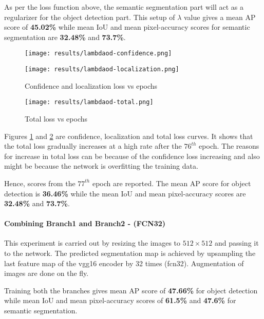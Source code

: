 \begin{itemize}
As per the loss function above, the semantic segmentation part will act as a regularizer for the object detection part. This setup of $\lambda$ value gives a mean AP score of \textbf{45.02\%} while mean IoU and mean pixel-accuracy scores for semantic segmentation are \textbf{32.48\%} and \textbf{73.7\%}.

\begin{figure}[h!]
\begin{multicols}{2}
    \texttt{[image: results/lambdaod-confidence.png]}\par \texttt{[image: results/lambdaod-localization.png]}\par
    \end{multicols}
\caption{Confidence and localization loss vs epochs}
\label{conf_loc}
\end{figure}

\begin{figure}[h!]
\centering
    \texttt{[image: results/lambdaod-total.png]}
    \caption{Total loss vs epochs}
    \label{totallosslambda}
\end{figure}

\end{itemize}

Figures \ref{conf_loc} and \ref{totallosslambda} are confidence, localization and total loss curves. It shows that the total loss gradually increases at a high rate after the $76^{th}$ epoch. The reasons for increase in total loss can be because of the confidence loss increasing and also might be because the network is overfitting the training data. 

Hence, scores from the $77^{th}$ epoch are reported. The mean AP score for object detection is \textbf{36.46\%} while the mean IoU and mean pixel-accuracy scores are \textbf{32.48\%} and \textbf{73.7\%}.

\paragraph{Combining Branch1 and Branch2 - (FCN32)}

This experiment is carried out by resizing the images to $512\times512$ and passing it to the network. The predicted segmentation map is achieved by upsampling the last feature map of the \ac{vgg}16 encoder by 32 times (\ac{fcn}32). Augmentation of images are done on the fly.

Training both the branches gives mean AP score of \textbf{47.66\%} for object detection while mean IoU and mean pixel-accuracy scores of \textbf{61.5\%} and \textbf{47.6\%} for semantic segmentation. 

